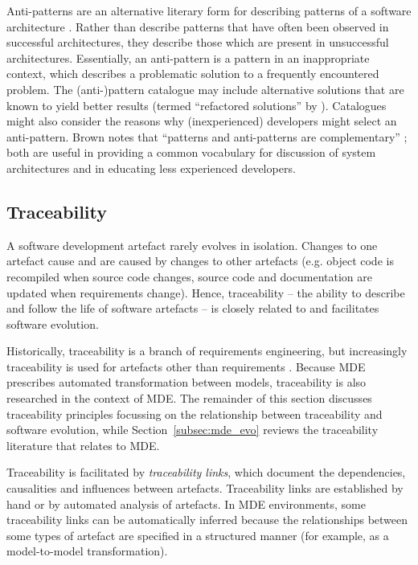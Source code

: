 Anti-patterns are an alternative literary form for describing patterns of a software architecture \cite{brown98antipatterns}. Rather than describe patterns that have often been observed in successful architectures, they describe those which are present in unsuccessful architectures. Essentially, an anti-pattern is a pattern in an inappropriate context, which describes a problematic solution to a frequently encountered problem. The (anti-)pattern catalogue may include alternative solutions that are known to yield better results (termed ``refactored solutions'' by \cite{brown98antipatterns}). Catalogues might also consider the reasons why (inexperienced) developers might select an anti-pattern. Brown notes that ``patterns and anti-patterns are complementary'' \cite[pg. 13]{brown98antipatterns}; both are useful in providing a common vocabulary for discussion of system architectures and in educating less experienced developers.


\subsection{Traceability}
\label{subsec:traceability}
A software development artefact rarely evolves in isolation. Changes to one artefact cause and are caused by changes to other artefacts (e.g. object code is recompiled when source code changes, source code and documentation are updated when requirements change). Hence, traceability -- the ability to describe and follow the life of software artefacts \cite{winkler09survey,lago09scoped} -- is closely related to and facilitates software evolution.

Historically, traceability is a branch of requirements engineering, but increasingly traceability is used for artefacts other than requirements \cite{winkler09survey}. Because MDE prescribes automated transformation between models, traceability is also researched in the context of MDE. The remainder of this section discusses traceability principles focussing on the relationship between traceability and software evolution, while Section~\ref{subsec:mde_evo} reviews the traceability literature that relates to MDE.

Traceability is facilitated by \emph{traceability links}, which document the dependencies, causalities and influences between artefacts. Traceability links are established by hand or by automated analysis of artefacts. In MDE environments, some traceability links can be automatically inferred because the relationships between some types of artefact are specified in a structured manner (for example, as a model-to-model transformation).

